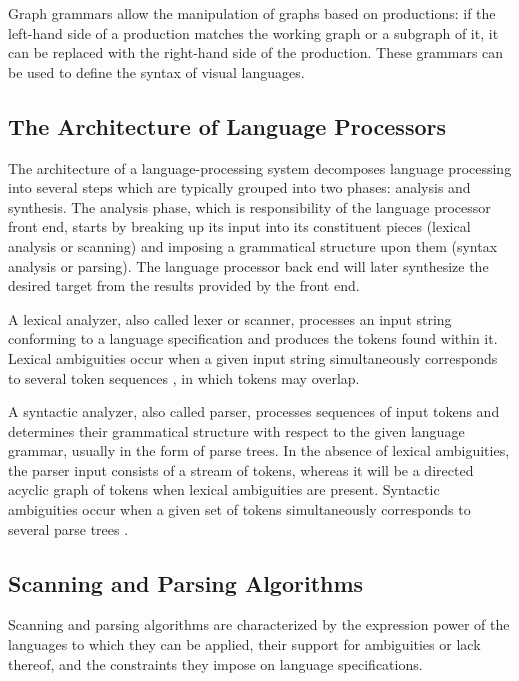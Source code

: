 \documentclass[preprint]{elsarticle}
\begin{document}
Graph grammars \cite{Ehrig1999} allow the manipulation of graphs based on productions: if the left-hand side of a production matches the working graph or a subgraph of it, it can be replaced with the right-hand side of the production.
These grammars can be used to define the syntax of visual languages.

\subsection{The Architecture of Language Processors} \label{subsec:architecture}

The architecture of a language-processing system decomposes language processing into several steps which are typically grouped into two phases: analysis and synthesis.
The analysis phase, which is responsibility of the language processor front end, starts by breaking up its input into its constituent pieces (lexical analysis or scanning) and imposing a grammatical structure upon them (syntax analysis or parsing).
The language processor back end will later synthesize the desired target from the results provided by the front end.

A lexical analyzer, also called lexer or scanner, processes an input string conforming to a language specification and produces the tokens found within it.
Lexical ambiguities occur when a given input string simultaneously corresponds to several token sequences \cite{Nawrocki1991}, in which tokens may overlap.

A syntactic analyzer, also called parser, processes sequences of input tokens and determines their grammatical structure with respect to the given language grammar, usually in the form of parse trees.
In the absence of lexical ambiguities, the parser input consists of a stream of tokens, whereas it will be a directed acyclic graph of tokens when lexical ambiguities are present.
Syntactic ambiguities occur when a given set of tokens simultaneously corresponds to several parse trees \cite{Aho1975}.

\subsection{Scanning and Parsing Algorithms} \label{subsec:algorithms}

Scanning and parsing algorithms are characterized by the expression power of the languages to which they can be applied, their support for ambiguities or lack thereof, and the constraints they impose on language specifications.
\end{document}
